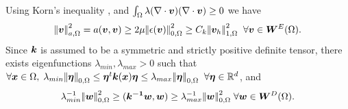 Using Korn's inequality \cite{brenner2008mathematical,ciarlet2002}, and $\int_{\Omega} \lambda (\nabla \cdot \boldsymbol{v}  )(\nabla \cdot \boldsymbol{v}  ) \geq 0 $ we have
\begin{equation}
\anorm{\dispconttest}^{2}=a( \dispconttest,\dispconttest)\geq 2\mu \ltwonorm{\epsilon(\dispconttest)}^{2}\geq C_{k}\honenorm{\dispdisctest}^{2}\;\;\forall \dispconttest \in \dispspace.
\label{eqn:a_coercive}
\end{equation}
Since $\boldsymbol{k}$ is assumed to be a symmetric and strictly positive definite tensor, there exists eigenfunctions $\lambda_{min},\lambda_{max} > 0 $ such that $\forall \boldsymbol{x} \in \Omega, \; \lambda_{min} {\left\vert\kern-0.25ex\left\vert \mathcal{\boldsymbol{\eta}} \right\vert\kern-0.25ex\right\vert}_{0,\Omega} \leq  \boldsymbol{\eta}^{t} \boldsymbol{k}(\boldsymbol{x})\boldsymbol{\eta} \leq  \lambda_{max} {\left\vert\kern-0.25ex\left\vert \mathcal{\boldsymbol{\eta}} \right\vert\kern-0.25ex\right\vert}_{0,\Omega} \;\; \forall \boldsymbol{\eta} \in \mathbb{R}^{d}$, and
\begin{equation}
\label{eqn:m_coercive}
{\lambda_{min}^{-1}}\ltwonorm{\fluxconttest}^{2} \geq (\perminv \fluxconttest,\fluxconttest) \geq {\lambda_{max}^{-1}}\ltwonorm{\fluxconttest}^{2} \; \forall \fluxconttest \in \fluxspace.
\end{equation}

